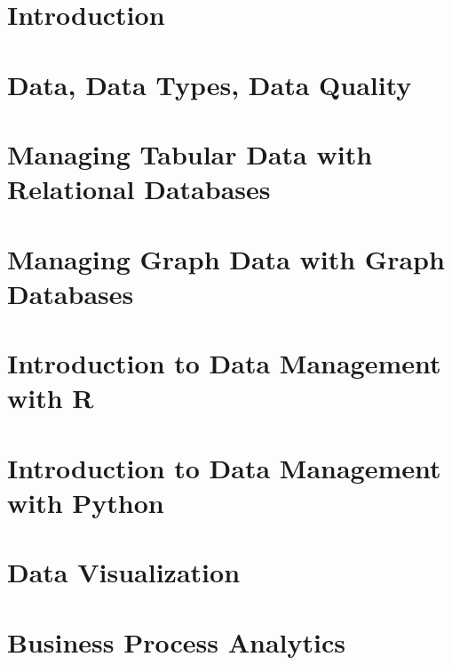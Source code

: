 \documentclass{book}
\begin{document}
\chapter{Introduction}


\graphicspath{{class02/}}
\chapter{Data, Data Types, Data Quality}


\graphicspath{{class03/}}
\chapter{Managing Tabular Data with Relational Databases}


{  
\graphicspath{{class04/}}
\chapter{Managing Graph Data with Graph Databases}

}

\begin{withcode}
\graphicspath{{class05/}}
\chapter{Introduction to Data Management with R}


\graphicspath{{class06/}}
\chapter{Introduction to Data Management with Python}

\end{withcode}

\graphicspath{{class07/}}
\chapter{Data Visualization}


\graphicspath{{class09/}}
\chapter{Business Process Analytics}


\graphicspath{{class11/}}
\end{document}
